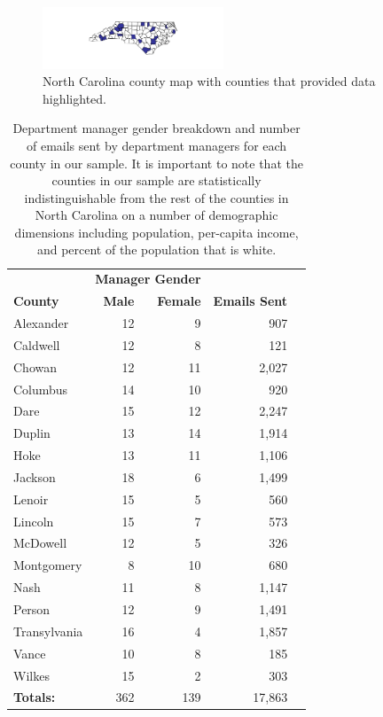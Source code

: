 \documentclass{pnastwo}
\begin{document}
\begin{article}
	\begin{figure}
		\centering
	\caption{\label{fig:nc map} North Carolina county map with counties that provided data highlighted.}	
	\centering
	\includegraphics[width = 0.48\textwidth]{images/County_Map.pdf}
	\end{figure}
	
	\begin{table}
	\centering
		\begin{tabular}{lrrrr}
		  \hline
		  & \multicolumn{2}{c}{\textbf{Manager Gender}} & \\
		  \cmidrule{2-3}
		 \textbf{County} & \textbf{Male} & \textbf{Female} & \textbf{Emails Sent}  \\
		  \hline
		Alexander & 12 & 9 & 907   \\
		Caldwell & 12 & 8 & 121     \\
		Chowan & 12 & 11 & 2,027   \\
		Columbus & 14 & 10 & 920   \\
		Dare & 15 & 12 & 2,247    \\
		Duplin & 13 & 14 & 1,914    \\
		Hoke & 13 & 11 & 1,106  \\
		Jackson & 18 & 6 & 1,499    \\
		Lenoir & 15 & 5 & 560  \\
		Lincoln & 15 & 7 & 573   \\
		McDowell & 12 & 5 & 326   \\
		Montgomery & 8 & 10 & 680   \\
		Nash & 11 & 8 & 1,147  \\
		Person & 12 & 9 & 1,491   \\
		Transylvania & 16 & 4 & 1,857  \\
		Vance & 10 & 8 & 185   \\
		Wilkes & 15 & 2 & 303   \\
		   \hline
		   \textbf{Totals:} & 362 & 139 & 17,863 \\
		   \hline
		\end{tabular}
		\caption{\label{tab:county aggregate stats}Department manager gender breakdown and number of emails sent by department managers for each county in our sample. It is important to note that the counties in our sample are statistically indistinguishable from the rest of the counties in North Carolina on a number of demographic dimensions including population, per-capita income, and percent of the population that is white. \\}
	\end{table}
	

\end{article}
\end{document}
